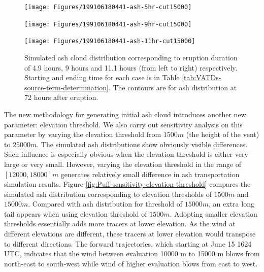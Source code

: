 \documentclass[draft,linenumbers]{agujournal2019}
\begin{document}
\begin{figure}[!htb]
    \centering
    \begin{minipage}{.325\textwidth}
        \centering
        \texttt{[image: Figures/199106180441-ash-5hr-cut15000]}
    \end{minipage}%
    \begin{minipage}{.325 \textwidth}
        \centering
        \texttt{[image: Figures/199106180441-ash-9hr-cut15000]}
    \end{minipage}%
    \begin{minipage}{.325 \textwidth}
        \centering
        \texttt{[image: Figures/199106180441-ash-11hr-cut15000]}
    \end{minipage}%
    \caption{Simulated ash cloud distribution corresponding to eruption duration of 4.9 hours, 9 hours and 11.1 hours (from left to right) respectively. Starting and ending time for each case is in Table \ref{tab:VATDs-source-term-determination}. The contours are for ash distribution at 72 hours after eruption.}
    \label{fig:Puff-sensitivity-duration}
\end{figure}

The new methodology for generating initial ash cloud introduces another new parameter: elevation threshold. We also carry out sensitivity analysis on this parameter by varying the elevation threshold from $1500 m$ (the height of the vent) to $25000 m$. The simulated ash distributions show obviously visible differences. Such influence is especially obvious when the elevation threshold is either very large or very small. However, varying the elevation threshold in the range of $[12000, 18000] m$ generates relatively small difference in ash transportation simulation results. Figure \ref{fig:Puff-sensitivity-elevation-threshold} compares the simulated ash distribution corresponding to elevation thresholds of $1500 m$ and $15000 m$. Compared with ash distribution for threshold of $15000 m$, an extra long tail appears when using elevation threshold of $1500 m$. Adopting smaller elevation thresholds essentially adds more tracers at lower elevation. As the wind at different elevations are different, these tracers at lower elevation would transpose to different directions. The forward trajectories, which starting at June 15 1624 UTC, indicates that the wind between evaluation 10000 m to 15000 m blows from north-east to south-west while wind of higher evaluation blows from east to west. 
\end{document}
